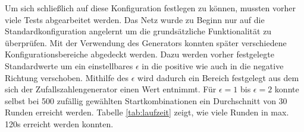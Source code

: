 Um sich schließlich auf diese Konfiguration festlegen zu können, mussten vorher viele Tests abgearbeitet werden. Das Netz wurde zu Beginn nur auf die Standardkonfiguration angelernt um die grundsätzliche Funktionalität zu überprüfen. Mit der Verwendung des Generators konnten später verschiedene Konfigurationsbereiche abgedeckt werden. Dazu werden vorher festgelegte Standardwerte um ein einstellbares $ \epsilon $ in die positive wie auch in die negative Richtung verschoben. Mithilfe des $ \epsilon $ wird dadurch ein Bereich festgelegt aus dem sich der Zufallszahlengenerator einen Wert entnimmt. Für $ \epsilon=1 $ bis $ \epsilon = 2 $ konnte selbst bei 500 zufällig gewählten Startkombinationen ein Durchschnitt von 30 Runden erreicht werden. Tabelle \ref{tab:laufzeit} zeigt, wie viele Runden in max. 120s erreicht werden konnten.

